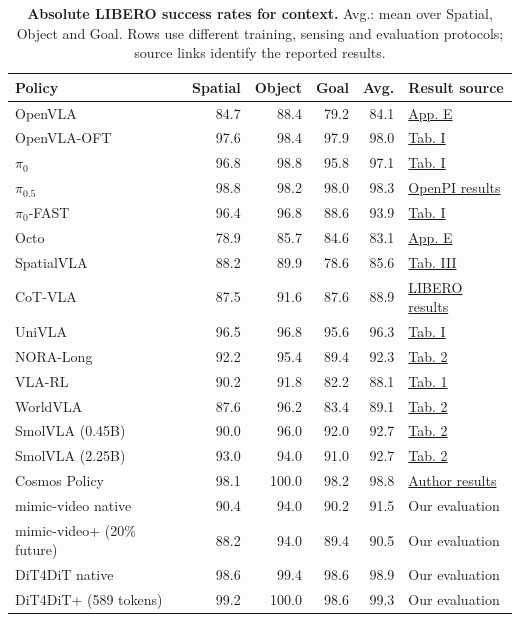 \begin{table}[t]
  \centering
  \caption{\textbf{Absolute LIBERO success rates for context.}
  Avg.: mean over Spatial, Object and Goal.
  Rows use different training, sensing and evaluation protocols; source links identify the reported results.}
  \label{tab:absolute_success}
  \small
  \setlength{\tabcolsep}{6pt}
  \begin{tabular}{lrrrrl}
    \toprule
    Policy & Spatial & Object & Goal & Avg. & Result source \\
    \midrule
    OpenVLA & 84.7 & 88.4 & 79.2 & 84.1 & \href{https://arxiv.org/abs/2406.09246}{App. E} \\
    OpenVLA-OFT & 97.6 & 98.4 & 97.9 & 98.0 & \href{https://arxiv.org/abs/2502.19645}{Tab. I} \\
    $\pi_0$ & 96.8 & 98.8 & 95.8 & 97.1 & \href{https://arxiv.org/abs/2502.19645}{Tab. I} \\
    $\pi_{0.5}$ & 98.8 & 98.2 & 98.0 & 98.3 & \href{https://huggingface.co/docs/lerobot/libero}{OpenPI results} \\
    $\pi_0$-FAST & 96.4 & 96.8 & 88.6 & 93.9 & \href{https://arxiv.org/abs/2502.19645}{Tab. I} \\
    Octo & 78.9 & 85.7 & 84.6 & 83.1 & \href{https://arxiv.org/abs/2406.09246}{App. E} \\
    SpatialVLA & 88.2 & 89.9 & 78.6 & 85.6 & \href{https://arxiv.org/abs/2501.15830}{Tab. III} \\
    CoT-VLA & 87.5 & 91.6 & 87.6 & 88.9 & \href{https://arxiv.org/abs/2503.22020}{LIBERO results} \\
    UniVLA & 96.5 & 96.8 & 95.6 & 96.3 & \href{https://arxiv.org/abs/2505.06111}{Tab. I} \\
    NORA-Long & 92.2 & 95.4 & 89.4 & 92.3 & \href{https://arxiv.org/abs/2504.19854}{Tab. 2} \\
    VLA-RL & 90.2 & 91.8 & 82.2 & 88.1 & \href{https://arxiv.org/abs/2505.18719}{Tab. 1} \\
    WorldVLA & 87.6 & 96.2 & 83.4 & 89.1 & \href{https://arxiv.org/abs/2506.21539}{Tab. 2} \\
    SmolVLA (0.45B) & 90.0 & 96.0 & 92.0 & 92.7 & \href{https://arxiv.org/html/2506.01844v1}{Tab. 2} \\
    SmolVLA (2.25B) & 93.0 & 94.0 & 91.0 & 92.7 & \href{https://arxiv.org/html/2506.01844v1}{Tab. 2} \\
    Cosmos Policy & 98.1 & 100.0 & 98.2 & 98.8 & \href{https://research.nvidia.com/labs/cosmos-lab/cosmos-policy/}{Author results} \\
    \midrule
    mimic-video native & 90.4 & 94.0 & 90.2 & 91.5 & Our evaluation \\
    mimic-video+ (20\% future) & 88.2 & 94.0 & 89.4 & 90.5 & Our evaluation \\
    DiT4DiT native & 98.6 & 99.4 & 98.6 & 98.9 & Our evaluation \\
    DiT4DiT+ (589 tokens) & 99.2 & 100.0 & 98.6 & 99.3 & Our evaluation \\
    \bottomrule
  \end{tabular}
\end{table}
